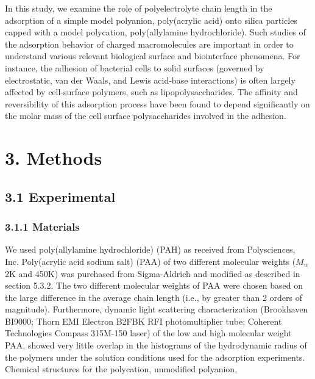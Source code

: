 \documentclass[journal=mamobx,manuscript=article]{achemso}
\begin{document}
In this study, we examine the role of polyelectrolyte chain length in the adsorption of a simple model polyanion, poly(acrylic acid) onto silica particles capped with a model polycation, poly(allylamine hydrochloride).  Such studies of the adsorption behavior of charged macromolecules are important in order to understand various relevant biological surface and biointerface phenomena.  For instance, the adhesion of bacterial cells to solid surfaces (governed by electrostatic, van der Waals, and Lewis acid-base interactions) is often largely affected by cell-surface polymers, such as lipopolysaccharides.\cite{Jucker1997}  The affinity and reversibility of this adsorption process have been found to depend significantly on the molar mass of the cell surface polysaccharides involved in the adhesion.\cite{Jucker1997} 

\section{3. Methods}

\subsection{3.1 Experimental}

\subsubsection{3.1.1 Materials}

We used poly(allylamine hydrochloride) (PAH) as received from Polysciences, Inc. Poly(acrylic acid sodium salt) (PAA) of two different molecular weights ($M_{w}$ 2K and 450K) was purchased from Sigma-Aldrich and modified as described in section 5.3.2.  The two different molecular weights of PAA were chosen based on the large difference in the average chain length (i.e., by greater than 2 orders of magnitude).  Furthermore, dynamic light scattering characterization (Brookhaven BI9000; Thorn EMI Electron B2FBK RFI photomultiplier tube; Coherent Technologies Compass 315M-150 laser) of the low and high molecular weight PAA, showed very little overlap in the histograms of the hydrodynamic radius of the polymers under the solution conditions used for the adsorption experiments.  Chemical structures for the polycation, unmodified polyanion, 
\end{document}
